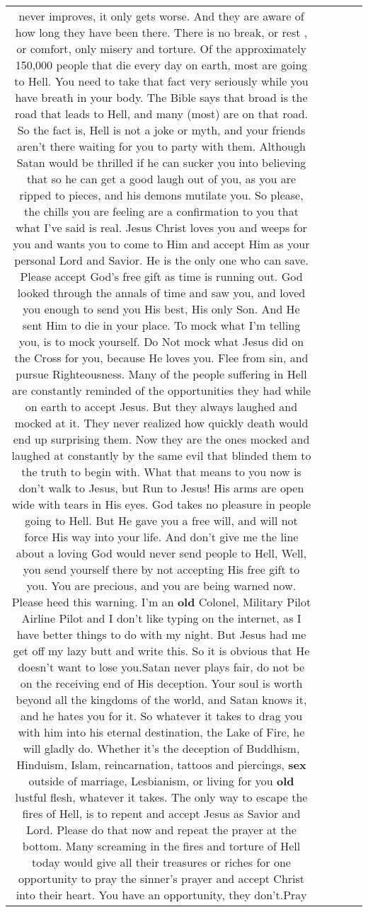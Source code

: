 \documentclass[11pt]{article}
\newlength\mylength
\begin{document}
\begin{center}
\begin{longtable}{|C{.65\mylength}|C{.30\mylength}|C{.12\mylength}|C{.12\mylength}|C{.12\mylength}|}
never improves, it only gets worse. And they are aware of how long they have been there. There is no break, or rest , or comfort, only misery and torture. Of the approximately 150,000 people that die every day on earth, most are going to Hell. You need to take that fact very seriously while you have breath in your body. The Bible says that broad is the road that leads to Hell, and many (most) are on that road. So the fact is, Hell is not a joke or myth, and your friends aren't there waiting for you to party with them. Although Satan would be thrilled if he can sucker you into believing that so he can get a good laugh out of you, as you are ripped to pieces, and his demons mutilate you. So please, the chills you are feeling are a confirmation to you that what I've said is real. Jesus Christ loves you and weeps for you and wants you to come to Him and accept Him as your personal Lord and Savior. He is the only one who can save. Please accept God's free gift as time is running out. God looked through the annals of time and saw you, and loved you enough to send you His best, His only Son. And He sent Him to die in your place. To mock what I'm telling you, is to mock yourself. Do Not mock what Jesus did on the Cross for you, because He loves you. Flee from sin, and pursue Righteousness. Many of the people suffering in Hell are constantly reminded of the opportunities they had while on earth to accept Jesus. But they always laughed and mocked at it. They never realized how quickly death would end up surprising them. Now they are the ones mocked and laughed at constantly by the same evil that blinded them to the truth to begin with. What that means to you now is don't walk to Jesus, but Run to Jesus! His arms are open wide with tears in His eyes. God takes no pleasure in people going to Hell. But He gave you a free will, and will not force His way into your life. And don't give me the line about a loving God would never send people to Hell, Well, you send yourself there by not accepting His free gift to you. You are precious, and you are being warned now. Please heed this warning. I'm an \textbf{old} Colonel, Military Pilot Airline Pilot and I don't like typing on the internet, as I have better things to do with my night. But Jesus had me get off my lazy butt and write this. So it is obvious that He doesn't want to lose you.Satan never plays fair, do not be on the receiving end of His deception. Your soul is worth beyond all the kingdoms of the world, and Satan knows it, and he hates you for it. So whatever it takes to drag you with him into his eternal destination, the Lake of Fire, he will gladly do. Whether it's the deception of Buddhism, Hinduism, Islam, reincarnation, tattoos and piercings, \textbf{sex} outside of marriage, Lesbianism, or living for you \textbf{old} lustful flesh, whatever it takes. The only way to escape the fires of Hell, is to repent and accept Jesus as Savior and Lord. Please do that now and repeat the prayer at the bottom. Many screaming in the fires and torture of Hell today would give all their treasures or riches for one opportunity to pray the sinner's prayer and accept Christ into their heart. You have an opportunity, they don't.Pray 
\end{longtable}
\end{center}
\end{document}
